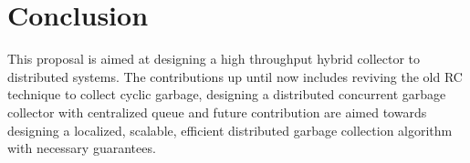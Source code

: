 \section{Conclusion}
This proposal is aimed at designing a high throughput hybrid collector to distributed systems. The contributions up until now includes  reviving the old RC technique to collect cyclic garbage, designing a distributed concurrent garbage collector with centralized queue and future contribution are aimed towards designing a localized, scalable, efficient distributed 
 garbage collection algorithm with necessary guarantees.
